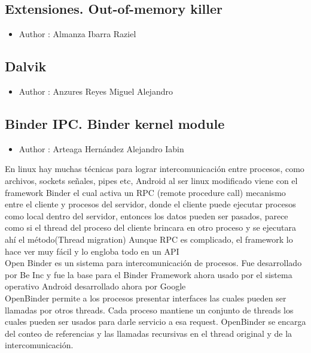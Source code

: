 \documentclass[a4paper]{article}
\begin{document}
\subsection{Extensiones. Out-of-memory killer}
\begin{itemize}
\item Author : Almanza Ibarra Raziel
\end{itemize}

\subsection{Dalvik}
\begin{itemize}
\item Author : Anzures Reyes Miguel Alejandro
\end{itemize}

\newpage 
\subsection{Binder IPC. Binder kernel module}
\begin{itemize}
\item Author : Arteaga Hernández Alejandro Iabin
\end{itemize}	

En linux hay muchas técnicas para lograr intercomunicación entre procesos, como archivos, sockets señales, pipes etc,
Android al ser linux modificado viene con el framework Binder el cual activa un RPC (remote procedure call) mecanismo entre el cliente y procesos del servidor, donde el cliente puede ejecutar procesos como local dentro del servidor, entonces los datos pueden ser pasados, parece como si el thread del proceso del cliente brincara en otro proceso y se ejecutara ahí el método(Thread migration)
Aunque RPC es complicado, el framework lo hace ver muy fácil y lo engloba todo en un API
\\
Open Binder es un sistema para intercomunicación de procesos. Fue desarrollado por Be Inc y fue la base para el Binder Framework ahora usado por el sistema operativo Android desarrollado ahora por Google
\\
OpenBinder  permite a los procesos presentar interfaces las cuales pueden ser llamadas por otros threads. Cada proceso mantiene un conjunto de threads los cuales pueden ser usados para darle servicio a esa request. OpenBinder se encarga del conteo de referencias y las llamadas recursivas en el thread original y de la intercomunicación.
\end{document}
